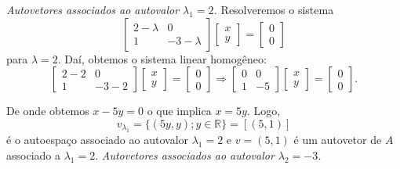 \begin{enumerate}
\textit{{Autovetores associados ao autovalor $\lambda_1=2$.}} Resolveremos o sistema
$$
 \begin{bmatrix}
2-\lambda & 0\\
 1& -3-\lambda
\end{bmatrix}
 \begin{bmatrix}
x\\
y
\end{bmatrix}=
\begin{bmatrix}
0\\
0
\end{bmatrix}
$$
para $\lambda=2$. Daí, obtemos o sistema linear homogêneo:
$$
 \begin{bmatrix}
2-2 & 0\\
 1& -3-2
\end{bmatrix}
 \begin{bmatrix}
x\\
y
\end{bmatrix}=
\begin{bmatrix}
0\\
0
\end{bmatrix} \Rightarrow
 \begin{bmatrix}
0 & 0\\
 1& -5
\end{bmatrix}
 \begin{bmatrix}
x\\
y
\end{bmatrix}=
\begin{bmatrix}
0\\
0
\end{bmatrix}
.$$

De onde obtemos $x-5y=0$ o que implica $x=5y$.  Logo, $$v_{\lambda_1}=\{ (5y, y); y \in \mathbb{R}\}=[(5,1)] $$ é o autoespaço associado ao autovalor $\lambda_1=2$ e $v=(5,1)$ é um autovetor de $A$ associado a $\lambda_1=2$.
\textit{{Autovetores associados ao autovalor $\lambda_2=-3$.}}


\end{enumerate}
